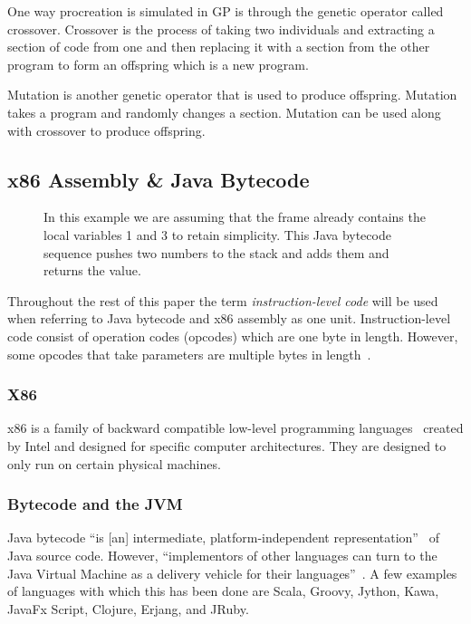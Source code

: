 \documentclass{sig-alternate}
\begin{document}
	One way procreation is simulated in GP is through the genetic operator called crossover. Crossover is the process of taking two individuals and extracting a section of code from one and then replacing it with a section from the other program to form an offspring which is a new program.\par 
	
	Mutation is another genetic operator that is used to produce offspring. Mutation takes a program and randomly changes a section. Mutation can be used along with crossover to produce offspring.


\subsection{x86 Assembly \& Java Bytecode}

\begin{figure}
\centering
{}

\caption{In this example we are assuming that the frame already contains the local variables 1 and 3 to retain simplicity. This Java bytecode sequence pushes two numbers to the stack and adds them and returns the value.}
\label{stack}
\end{figure}


Throughout the rest of this paper the term \textit{instruction-level code} will be used when referring to Java bytecode and x86 assembly as one unit. Instruction-level code consist of operation codes (opcodes) which are one byte in length. However, some opcodes that take parameters are multiple bytes in length~\cite{JavaBytecode:2014,x86tomachine:2013}.

\subsubsection{X86}
x86 is a family of backward compatible low-level programming languages~\cite{x86assembly:2014} created by Intel and designed for specific computer architectures. They are designed to only run on certain physical machines. 

\subsubsection{ Bytecode and the JVM}
Java bytecode ``is [an] intermediate, platform-independent representation''~\cite{FINCH2:2009} of Java source code. However, ``implementors of other languages can turn to the Java Virtual Machine as a delivery vehicle for their languages''~\cite{JVMspec:2013}. A few examples of languages with which this has been done are Scala, Groovy, Jython, Kawa, JavaFx Script, Clojure, Erjang, and JRuby.
\end{document}

